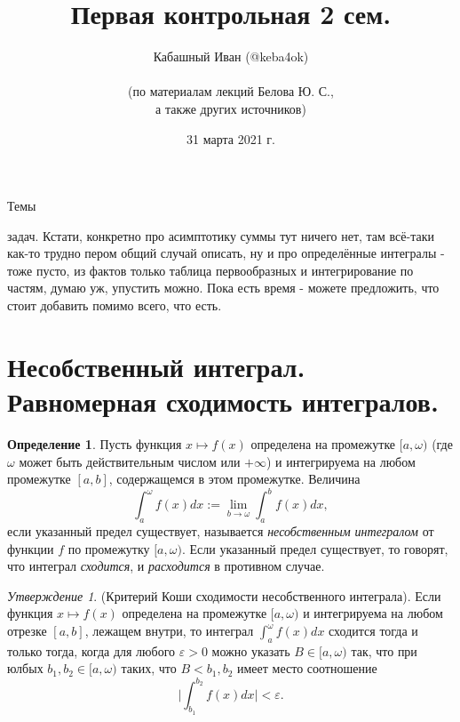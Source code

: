 \documentclass[a4paper,100pt]{article}
\title{Первая контрольная 2 сем.}
\author{Кабашный Иван (@keba4ok)\\ \\ (по материалам лекций Белова Ю. С.,\\ а также других источников)}
\date{31 марта 2021 г.}
\theoremstyle{indented}
\theoremstyle{definition}
\newtheorem{defn}{Определение}
\theoremstyle{remark}
\newtheorem{stat}{Утверждение}
\begin{document}
\newcommand{\resetexlcounters}{%
  \setcounter{exl}{0}%
} 

\newcommand{\resetremarkcounters}{%
  \setcounter{remark}{0}%
} 

\newcommand{\reseconscounters}{%
  \setcounter{cons}{0}%
} 

\newcommand{\resetall}{%
    \resetexlcounters
    \resetremarkcounters
    \reseconscounters%
}

\maketitle 

\newpage

\hypertarget{t1}{Темы} задач. Кстати, конкретно про асимптотику суммы тут ничего нет, там всё-таки как-то трудно пером общий случай описать, ну и про определённые интегралы - тоже пусто, из фактов только таблица первообразных и интегрирование по частям, думаю уж, упустить можно. Пока есть время - можете предложить, что стоит добавить помимо всего, что есть.
\tableofcontents

\newpage

\section{Несобственный интеграл. \\
Равномерная сходимость интегралов.}

\begin{defn}
    Пусть функция $x \mapsto f(x)$ определена на промежутке $[a, \omega)$ (где $\omega$ может быть действительным числом или $+\infty$) и интегрируема на любом промежутке $[a, b]$, содержащемся в этом промежутке. Величина 
    \[
        \int_a^\omega f(x)dx:=\lim_{b \rightarrow \omega} \int_a^b f(x)dx, 
    \] 
    если указанный предел существует, называется \textit{несобственным интегралом} от функции $f$ по промежутку $[a, \omega)$. Если указанный предел существует, то говорят, что интеграл \textit{сходится}, и \textit{расходится} в противном случае.
\end{defn}

\begin{stat}
    (Критерий Коши сходимости несобственного интеграла). Если функция $x\mapsto f(x)$ определена на промежутке $[a, \omega)$ и интегрируема на любом отрезке $[a, b]$, лежащем внутри, то интеграл $\int_a^\omega f(x)dx$ сходится тогда и только тогда, когда для любого $\varepsilon>0$ можно указать $B\in [a, \omega)$ так, что при юлбых $b_1, b_2\in [a, \omega)$ таких, что $B<b_1, b_2$ имеет место соотношение 
    \[
        \bigg| \int_{b_1}^{b_2}f(x)dx\bigg| < \varepsilon. 
    \]
\end{stat}
\end{document}

